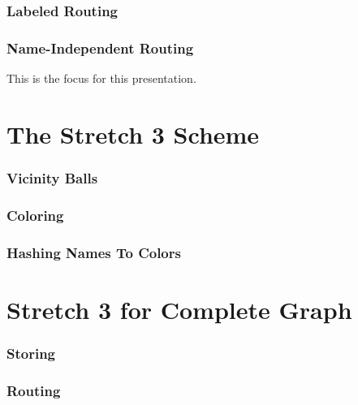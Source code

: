 \documentclass[10pt, compress]{beamer}
\begin{document}
\begin{frame}[fragile]
  \frametitle{Labeled Routing}



\end{frame}

\begin{frame}[fragile]
  \frametitle{Name-Independent Routing}


  This is the focus for this presentation.

\end{frame} 


\section{The Stretch 3 Scheme}

\begin{frame}[fragile]
  \frametitle{Vicinity Balls}


\end{frame}

\begin{frame}[fragile]
  \frametitle{Coloring}


\end{frame}

\begin{frame}[fragile]
  \frametitle{Hashing Names To Colors}


\end{frame}

\section{Stretch 3 for Complete Graph}

\begin{frame}[fragile]
  \frametitle{Storing}


\end{frame}


\begin{frame}[fragile]
  \frametitle{Routing}


\end{frame}
\end{document}
